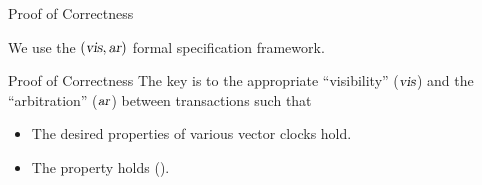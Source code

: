 
\begin{frame}{Proof of Correctness}
  \begin{center}
    We use the $(\textsl{vis}, \textsl{ar})$ formal specification framework.

    \vspace{0.60cm}
  \end{center}
\end{frame}

\begin{frame}{Proof of Correctness}
  The key is to  the appropriate ``visibility'' ($\textsl{vis}$) 
  and the ``arbitration'' ($\textsl{ar}$)  between transactions such that \\[10pt]

  \begin{itemize}
    \setlength{\itemsep}{8pt}
    \item The desired properties of various vector clocks hold.
    \item The  property holds ().
  \end{itemize}
\end{frame}
